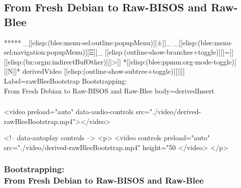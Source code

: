 \begin{whenOrg}
\section{From Fresh Debian to Raw-BISOS and Raw-Blee}


\begin{whenOrg}
*****  _[[elisp:(blee:menu-sel:outline:popupMenu)][±]]_ _[[elisp:(blee:menu-sel:navigation:popupMenu)][Ξ]]_ [[elisp:(outline-show-branches+toggle)][|=]] [[elisp:(bx:orgm:indirectBufOther)][|>]] *[[elisp:(blee:ppmm:org-mode-toggle)][|N]]*  derivedVideo [[elisp:(outline-show-subtree+toggle)][||]] Label=rawBleeBootstrap Bootstrapping:\\ From Fresh Debian to Raw-BISOS and Raw-Blee body=derivedInsert
\end{whenOrg}

\begin{htmlonly}

\begin{frame}[fragile,plain,label=rawBleeBootstrap]
    \frametitle{}
    \framesubtitle{}
    \begin{presentationMode}
    \begin{rawhtml}
<video preload="auto" data-audio-controls src="./video/derived-rawBleeBootstrap.mp4"></video>
    \end{rawhtml}
    \end{presentationMode}

    \begin{articleMode}
    \begin{rawhtml}
    <!-- data-autoplay  controls -->
    <p>
    <video controls  preload="auto" src="./video/derived-rawBleeBootstrap.mp4" height="50%
    </video>
    </p>
     \end{rawhtml}
    \end{articleMode}
\end{frame}
\end{htmlonly}

\begin{verblatex}

\begin{frame}[fragile,plain,label=rawBleeBootstrap]
    \frametitle{Bootstrapping:\\ From Fresh Debian to Raw-BISOS and Raw-Blee}
    \framesubtitle{}



\end{frame}
\end{verblatex}
\end{whenOrg}
